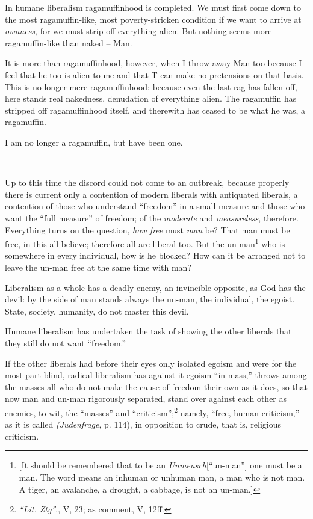 \documentclass[12pt,a4paper]{book}
\begin{document}
In humane liberalism ragamuffinhood is completed. We must first come down to 
the most ragamuffin-like, most poverty-stricken condition if we want to arrive 
at \textit{ownness}, for we must strip off everything alien. But nothing seems 
more ragamuffin-like than naked -- Man.

It is more than ragamuffinhood, however, when I throw away Man too because I 
feel that he too is alien to me and that T can make no pretensions on that 
basis. This is no longer mere ragamuffinhood: because even the last rag has 
fallen off, here stands real nakedness, denudation of everything alien. The 
ragamuffin has stripped off ragamuffinhood itself, and therewith has ceased to 
be what he was, a ragamuffin.

I am no longer a ragamuffin, but have been one.

\begin{center}
--------\end{center}


Up to this time the discord could not come to an outbreak, because properly 
there is current only a contention of modern liberals with antiquated 
liberals, a contention of those who understand ``freedom'' in a small 
measure and those who want the ``full measure'' of freedom; of the 
\textit{moderate} and \textit{measureless}, therefore. Everything turns on the 
question, \textit{how free} must \textit{man} be? That man must be free, in 
this all believe; therefore all are liberal too. But the un-man\footnote{[It 
should be remembered that to be an \textit{Unmensch}[``un-man''] one must be 
a man. The word means an inhuman or unhuman man, a man who is not man. A 
tiger, an avalanche, a drought, a cabbage, is not an un-man.]} who is 
somewhere in every individual, how is he blocked? How can it be arranged not 
to leave the un-man free at the same time with man?

Liberalism as a whole has a deadly enemy, an invincible opposite, as God has 
the devil: by the side of man stands always the un-man, the individual, the 
egoist. State, society, humanity, do not master this devil.

Humane liberalism has undertaken the task of showing the other liberals that 
they still do not want ``freedom.''

If the other liberals had before their eyes only isolated egoism and were for 
the most part blind, radical liberalism has against it egoism ``in mass,'' 
throws among the masses all who do not make the cause of freedom their own as 
it does, so that now man and un-man rigorously separated, stand over against 
each other as enemies, to wit, the ``masses'' and 
``criticism'';\footnote{\textit{``Lit. Ztg''}., V, 23; as comment, V, 12ff.} 
namely, ``free, human criticism,'' as it is called \textit{(Judenfrage}, p. 
114), in opposition to crude, that is, religious criticism.
\end{document}

